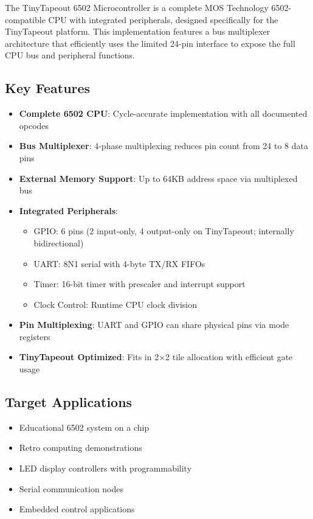 \documentclass[11pt,a4paper]{article}
\begin{document}
The TinyTapeout 6502 Microcontroller is a complete MOS Technology 6502-compatible CPU with integrated peripherals, designed specifically for the TinyTapeout platform. This implementation features a bus multiplexer architecture that efficiently uses the limited 24-pin interface to expose the full CPU bus and peripheral functions.

\subsection{Key Features}

\begin{itemize}[leftmargin=*]
    \item \textbf{Complete 6502 CPU}: Cycle-accurate implementation with all documented opcodes
    \item \textbf{Bus Multiplexer}: 4-phase multiplexing reduces pin count from 24 to 8 data pins
    \item \textbf{External Memory Support}: Up to 64KB address space via multiplexed bus
    \item \textbf{Integrated Peripherals}:
        \begin{itemize}
            \item GPIO: 6 pins (2 input-only, 4 output-only on TinyTapeout; internally bidirectional)
            \item UART: 8N1 serial with 4-byte TX/RX FIFOs
            \item Timer: 16-bit timer with prescaler and interrupt support
            \item Clock Control: Runtime CPU clock division
        \end{itemize}
    \item \textbf{Pin Multiplexing}: UART and GPIO can share physical pins via mode registers
    \item \textbf{TinyTapeout Optimized}: Fits in 2×2 tile allocation with efficient gate usage
\end{itemize}

\subsection{Target Applications}

\begin{itemize}[leftmargin=*]
    \item Educational 6502 system on a chip
    \item Retro computing demonstrations
    \item LED display controllers with programmability
    \item Serial communication nodes
    \item Embedded control applications
\end{itemize}
\end{document}

